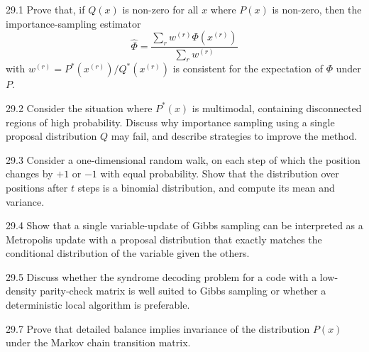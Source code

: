 \documentclass[12pt, a4paper]{article}
\begin{document}
\begin{prob}{29.1}
Prove that, if $Q(x)$ is non-zero for all $x$ where $P(x)$ is non-zero, then the importance-sampling estimator
\[
\hat{\Phi} = \frac{\sum_r w^{(r)}\Phi(x^{(r)})}{\sum_r w^{(r)}}
\]
with $w^{(r)} = P^\ast(x^{(r)})/Q^\ast(x^{(r)})$ is consistent for the expectation of $\Phi$ under $P$.
\end{prob}
\begin{sol}
\end{sol}
\bigskip

\begin{prob}{29.2}
Consider the situation where $P^\ast(x)$ is multimodal, containing disconnected regions of high probability. Discuss why importance sampling using a single proposal distribution $Q$ may fail, and describe strategies to improve the method.
\end{prob}
\begin{sol}
\end{sol}
\bigskip

\begin{prob}{29.3}
Consider a one-dimensional random walk, on each step of which the position changes by $+1$ or $-1$ with equal probability. Show that the distribution over positions after $t$ steps is a binomial distribution, and compute its mean and variance.
\end{prob}
\begin{sol}
\end{sol}
\bigskip

\begin{prob}{29.4}
Show that a single variable-update of Gibbs sampling can be interpreted as a Metropolis update with a proposal distribution that exactly matches the conditional distribution of the variable given the others.
\end{prob}
\begin{sol}
\end{sol}
\bigskip

\begin{prob}{29.5}
Discuss whether the syndrome decoding problem for a code with a low-density parity-check matrix is well suited to Gibbs sampling or whether a deterministic local algorithm is preferable.
\end{prob}
\begin{sol}
\end{sol}
\bigskip

\begin{prob}{29.7}
Prove that detailed balance implies invariance of the distribution $P(x)$ under the Markov chain transition matrix.
\end{prob}
\begin{sol}
\end{sol}
\bigskip
\end{document}
